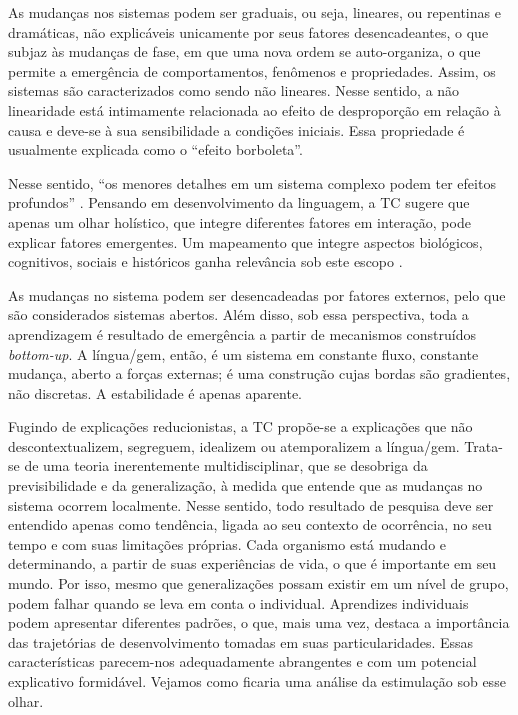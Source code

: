 \documentclass[output=paper,colorlinks,citecolor=brown,booklanguage=portuguese]{langscibook}
\begin{document}
As mudanças nos sistemas podem ser graduais, ou seja, lineares, ou repentinas e dramáticas, não explicáveis unicamente por seus fatores desencadeantes, o que subjaz às mudanças de fase, em que uma nova ordem se auto-organiza, o que permite a emergência de comportamentos, fenômenos e propriedades. Assim, os sistemas são caracterizados como sendo não lineares. Nesse sentido, a não linearidade está intimamente relacionada ao efeito de desproporção em relação à causa e deve-se à sua sensibilidade a condições iniciais. Essa propriedade é usualmente explicada como o “efeito borboleta”.


Nesse sentido, “os menores detalhes em um sistema complexo podem ter efeitos profundos” \citep[52]{LarsenFreeman2011}. Pensando em desenvolvimento da linguagem, a TC sugere que apenas um olhar holístico, que integre diferentes fatores em interação, pode explicar fatores emergentes. Um mapeamento que integre aspectos biológicos, cognitivos, sociais e históricos ganha relevância sob este escopo \citep{LarsenFreeman1997, LarsenFreeman2008, Beckner2009}.

As mudanças no sistema podem ser desencadeadas por fatores externos, pelo que são considerados sistemas abertos. Além disso, sob essa perspectiva, toda a aprendizagem é resultado de emergência a partir de mecanismos construídos \emph{bottom-up}. A língua/gem, então, é um sistema em constante fluxo, constante mudança, aberto a forças externas; é uma construção cujas bordas são gradientes, não discretas. A estabilidade é apenas aparente.

Fugindo de explicações reducionistas, a TC propõe-se a explicações que não descontextualizem, segreguem, idealizem ou atemporalizem a língua/gem. Tra\-ta-se de uma teoria inerentemente multidisciplinar, que se desobriga da previsibilidade e da generalização, à medida que entende que as mudanças no sistema ocorrem localmente. Nesse sentido, todo resultado de pesquisa deve ser entendido apenas como tendência, ligada ao seu contexto de ocorrência, no seu tempo e com suas limitações próprias. Cada organismo está mudando e determinando, a partir de suas experiências de vida, o que é importante em seu mundo. Por isso, mesmo que generalizações possam existir em um nível de grupo, podem falhar quando se leva em conta o individual. Aprendizes individuais podem apresentar diferentes padrões, o que, mais uma vez, destaca a importância das trajetórias de desenvolvimento tomadas em suas particularidades. Essas características parecem-nos adequadamente abrangentes e com um potencial explicativo formidável. Vejamos como ficaria uma análise da estimulação sob esse olhar.
\end{document}

